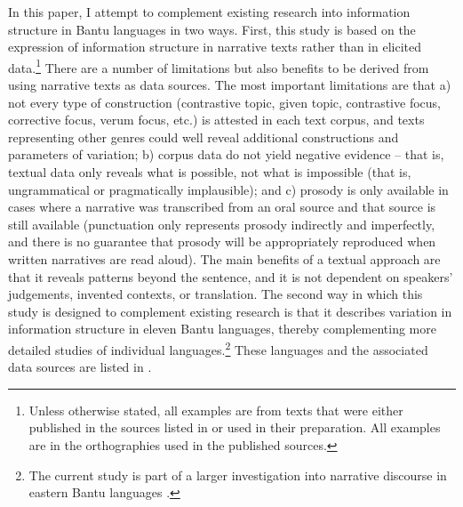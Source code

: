 \documentclass[output=paper]{langsci/langscibook}
\begin{document}
In this paper, I attempt to complement existing research into information structure in Bantu languages in two ways. First, this study is based on the expression of information structure in narrative texts rather than in elicited data.\footnote{Unless otherwise stated, all examples are from texts that were either published in the sources listed in  or used in their preparation. All examples are in the orthographies used in the published sources.} There are a number of limitations but also benefits to be derived from using narrative texts as data sources. The most important limitations are that a) not every type of construction (contrastive topic, given topic, contrastive focus, corrective focus, verum focus, etc.) is attested in each text corpus, and texts representing other genres could well reveal additional constructions and parameters of variation; b) corpus data do not yield negative evidence – that is, textual data only reveals what is possible, not what is impossible (that is, ungrammatical or pragmatically implausible); and c) prosody is only available in cases where a narrative was transcribed from an oral source and that source is still available (punctuation only represents prosody indirectly and imperfectly, and there is no guarantee that prosody will be appropriately reproduced when written narratives are read aloud). The main benefits of a textual approach are that it reveals patterns beyond the sentence, and it is not dependent on speakers’ judgements, invented contexts, or translation. The second way in which this study is designed to complement existing research is that it describes variation in information structure in eleven Bantu languages, thereby complementing more detailed studies of individual languages.\footnote{The current study is part of a larger investigation into narrative discourse in eastern Bantu languages \citep{Nicolle2015b}.} These languages and the associated data sources are listed in .
\end{document}
